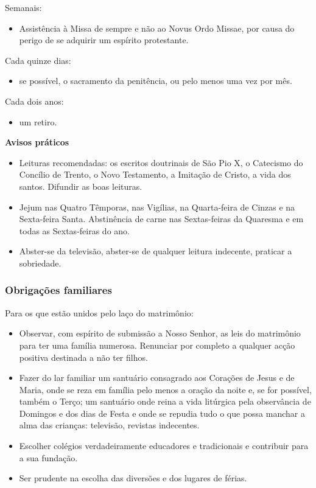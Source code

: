 \documentclass[11pt]{article}
\begin{document}
Semanais:
\begin{itemize}
	\item Assistência à Missa de sempre e não ao Novus Ordo Missae, por causa do perigo de se adquirir um espírito protestante.
\end{itemize}

Cada quinze dias:
\begin{itemize}
	\item se possível, o sacramento da penitência, ou pelo menos uma vez por mês.
\end{itemize}

Cada dois anos:
\begin{itemize}
	\item um retiro.
\end{itemize}

\textbf{Avisos práticos}

\begin{itemize}
	\item Leituras recomendadas: os escritos doutrinais de São Pio X, o Catecismo do Concílio de Trento, o Novo Testamento, a Imitação de Cristo, a vida dos santos.
    Difundir as boas leituras.
	\item Jejum nas Quatro Têmporas, nas Vigílias, na Quarta-feira de Cinzas e na Sexta-feira Santa.
    Abstinência de carne nas Sextas-feiras da Quaresma e em todas as Sextas-feiras do ano.
	\item Abster-se da televisão, abster-se de qualquer leitura indecente, praticar a sobriedade.
\end{itemize}

\subsubsection{Obrigações familiares}

Para os que estão unidos pelo laço do matrimônio:
\begin{itemize}
	\item Observar, com espírito de submissão a Nosso Senhor, as leis do matrimônio para ter uma família numerosa.
    Renunciar por completo a qualquer acção positiva destinada a não ter filhos.
    \item Fazer do lar familiar um santuário consagrado aos Corações de Jesus e de Maria, onde se reza em família pelo menos a oração da noite e, se for possível, também o Terço;
    um santuário onde reina a vida litúrgica pela observância de Domingos e dos dias de Festa e onde se repudia tudo o que possa manchar a alma das crianças: televisão, revistas indecentes.
    \item Escolher colégios verdadeiramente educadores e tradicionais e contribuir para a sua fundação.
    \item Ser prudente na escolha das diversões e dos lugares de férias.
\end{itemize}
\end{document}
